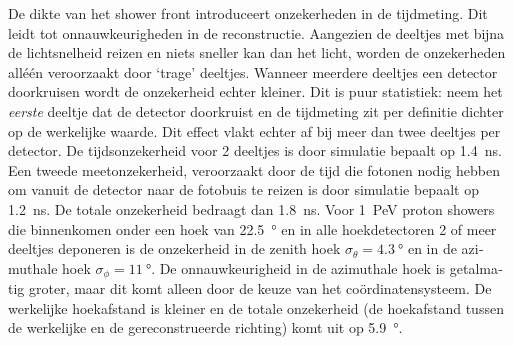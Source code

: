 \begin{otherlanguage}{dutch}
De dikte van het shower front introduceert onzekerheden in de tijdmeting.
Dit leidt tot onnauwkeurigheden in de reconstructie.  Aangezien de
deeltjes met bijna de lichtsnelheid reizen en niets sneller kan dan het
licht, worden de onzekerheden alléén veroorzaakt door `trage' deeltjes.
Wanneer meerdere deeltjes een detector doorkruisen wordt de onzekerheid
echter kleiner.  Dit is puur statistiek: neem het \emph{eerste} deeltje
dat de detector doorkruist en de tijdmeting zit per definitie dichter op
de werkelijke waarde.  Dit effect vlakt echter af bij meer dan twee
deeltjes per detector.  De tijdsonzekerheid voor 2 deeltjes is door
simulatie bepaalt op \SI{1.4}{\nano\second}.  Een tweede meetonzekerheid,
veroorzaakt door de tijd die fotonen nodig hebben om vanuit de detector
naar de fotobuis te reizen is door simulatie bepaalt op
\SI{1.2}{\nano\second}.  De totale onzekerheid bedraagt dan
\SI{1.8}{\nano\second}.  Voor \SI{1}{\peta\electronvolt} proton showers
die binnenkomen onder een hoek van \SI{22.5}{\degree} en in alle
hoekdetectoren 2 of meer deeltjes deponeren is de onzekerheid in de zenith
hoek $\sigma_\theta = \SI{4.3}{\degree}$ en in de azimuthale hoek
$\sigma_\phi = \SI{11}{\degree}$.  De onnauwkeurigheid in de azimuthale
hoek is getalmatig groter, maar dit komt alleen door de keuze van het
coördinatensysteem.  De werkelijke hoekafstand is kleiner en de totale
onzekerheid (de hoekafstand tussen de werkelijke en de gereconstrueerde
richting) komt uit op \SI{5.9}{\degree}.


\end{otherlanguage}
